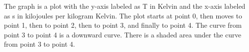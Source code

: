 The graph is a plot with the y-axis labeled as T in Kelvin and the x-axis labeled as s in kilojoules per kilogram Kelvin. The plot starts at point 0, then moves to point 1, then to point 2, then to point 3, and finally to point 4. The curve from point 3 to point 4 is a downward curve. There is a shaded area under the curve from point 3 to point 4.